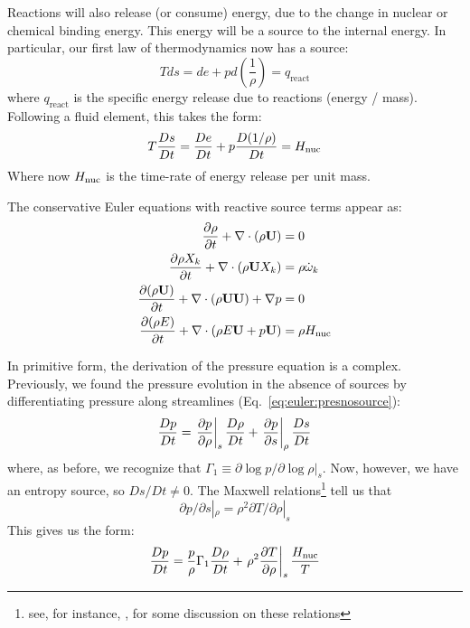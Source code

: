 Reactions will also release (or consume) energy, due to the change in
nuclear or chemical binding energy.  This energy will be a source to
the internal energy.  In particular, our first law of thermodynamics
now has a source:
\begin{equation}
T ds = de + p d \left( \frac{1}{\rho}\right ) = q_\mathrm{react}
\end{equation}
where $q_\mathrm{react}$ is the specific energy release due to
reactions (energy / mass).  Following a fluid element, this takes the
form:
\begin{equation}
T{\frac{{Ds}}{D t}} = {\frac{{De}}{D t}} + p {\frac{{D(1/\rho)}}{D t}} = {H_\mathrm{nuc}}
\end{equation}
Where now ${H_\mathrm{nuc}}$ is the time-rate of energy release per unit mass.

The conservative Euler equations with reactive source terms
appear as:
\begin{align}
{\frac{{\partial\rho}}{\partial t}} + \nabla \cdot (\rho {\bf U}) &= 0 \\
{\frac{{\partial\rho X_k}}{\partial t}} + \nabla \cdot (\rho {\bf U} X_k) &= \rho {\dot{\omega}}_k \\
{\frac{{\partial(\rho {\bf U})}}{\partial t}} + \nabla \cdot (\rho {\bf U} {\bf U}) + \nabla p &= 0 \\
{\frac{{\partial(\rho E)}}{\partial t}} + \nabla \cdot (\rho E {\bf U} + p {\bf U} ) &= \rho {H_\mathrm{nuc}}
\end{align}

In primitive form, the derivation of the pressure equation is a
complex.  Previously, we found the pressure evolution in the absence
of sources by differentiating pressure along streamlines
(Eq.~\ref{eq:euler:presnosource}):
\begin{equation}
\frac{Dp}{Dt} = \left . \frac{\partial p}{\partial \rho} \right |_s
     {\frac{{D\rho}}{D t}} + 
     \left . \frac{\partial p}{\partial s} \right |_\rho
     {\frac{{Ds}}{D t}}
\end{equation}
where, as before, we recognize that $\Gamma_1 \equiv \partial \log p/\partial \log \rho |_s$.
Now, however, we have an entropy source, so $Ds/Dt \ne 0$.  
The Maxwell relations\footnote{see, for instance, \cite{shu}, for some discussion
on these relations} tell us that
\begin{equation}
\partial p/\partial s |_\rho = \rho^2 \partial T/\partial \rho |_s
\end{equation}
This gives us the form:
\begin{equation}
\frac{Dp}{Dt} = \frac{p}{\rho} \Gamma_1 \frac{D\rho}{Dt} +
     \left . \rho^2 \frac{\partial T}{\partial \rho} \right |_s
     \frac{{H_\mathrm{nuc}}}{T}
\end{equation}

